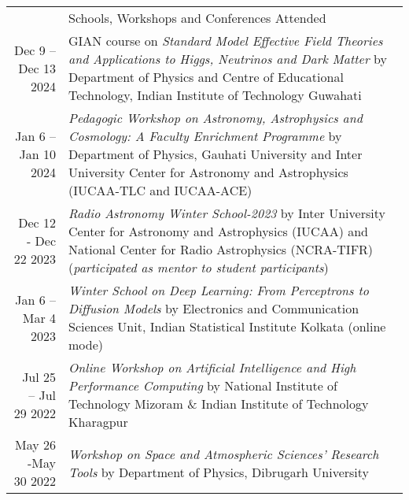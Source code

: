 \documentclass[a4paper, 11pt]{article}
\newcommand{\headingfont}{\Large\color{Bittersweet}}
\newenvironment{SectionTable}[1]{
	\renewcommand*{\arraystretch}{1.7}
	\setlength{\tabcolsep}{10pt}
	\begin{longtable}{Rp{5.2in}} & #1 \\}
{\end{longtable}\vspace{-.3cm}}
\begin{document}
\begin{SectionTable}{\headingfont Schools, Workshops and Conferences Attended}

Dec 9 -- Dec 13 2024 &
GIAN course on \textit{Standard Model Effective Field Theories and Applications to Higgs, Neutrinos and Dark Matter} 
by Department of Physics and Centre of Educational Technology, Indian Institute of Technology Guwahati
\\

Jan 6 -- Jan 10 2024 &
\textit{Pedagogic Workshop on Astronomy, Astrophysics and Cosmology: A Faculty Enrichment Programme} 
by Department of Physics, Gauhati University and Inter University Center for Astronomy and Astrophysics (IUCAA-TLC and IUCAA-ACE)
\\

Dec 12 - Dec 22 2023 &
\textit{Radio Astronomy Winter School-2023} 
by Inter University Center for Astronomy and Astrophysics (IUCAA)  and National Center for Radio Astrophysics (NCRA-TIFR) (\textit{participated as mentor to student participants})
\\

Jan 6 -- Mar 4 2023 &
\textit{Winter School on Deep Learning: From Perceptrons to Diffusion Models} 
by Electronics and Communication Sciences Unit, Indian Statistical Institute Kolkata (online mode)
\\

Jul 25 -- Jul 29 2022 & 
\textit{Online Workshop on Artificial Intelligence and High Performance Computing} 
by National Institute of Technology Mizoram \& Indian Institute of Technology Kharagpur
\\
	 
May 26 -May 30 2022 &
\textit{Workshop on Space and Atmospheric Sciences' Research Tools} 
by Department of Physics, Dibrugarh University
\\


 

\end{SectionTable}
\end{document}
